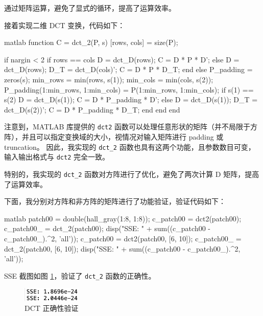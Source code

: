 \documentclass[a4paper]{article}  %
\begin{document}
通过矩阵运算，避免了显式的循环，提高了运算效率。

接着实现二维 DCT 变换，代码如下：

\begin{codeblock}{matlab}
function C = dct_2(P, s)
    [rows, cols] = size(P);
    
    if nargin < 2
        if rows == cols
            D = dct_D(rows);
            C = D * P * D';
        else
            D = dct_D(rows);
            D_T = dct_D(cols)';
            C = D * P * D_T;
        end
    else
        P_padding = zeros(s);
        min_rows = min(rows, s(1));
        min_cols = min(cols, s(2));
        P_padding(1:min_rows, 1:min_cols) = P(1:min_rows, 1:min_cols);
        if s(1) == s(2)
            D = dct_D(s(1));
            C = D * P_padding * D';
        else
            D = dct_D(s(1));
            D_T = dct_D(s(2))';
            C = D * P_padding * D_T;
        end
    end
end
\end{codeblock}

注意到，MATLAB 库提供的 \texttt{dct2} 函数可以处理任意形状的矩阵（并不局限于方阵），并且可以指定变换域的大小，视情况对输入矩阵进行 padding 或 truncation。
因此，我实现的 \texttt{dct\_2} 函数也具有这两个功能，且参数数目可变，输入输出格式与 \texttt{dct2} 完全一致。

特别的，我实现的 \texttt{dct\_2} 函数对方阵进行了优化，避免了两次计算 D 矩阵，提高了运算效率。

下面，我分别对方阵和非方阵的矩阵进行了功能验证，验证代码如下：

\begin{codeblock}{matlab}
patch00 = double(hall_gray(1:8, 1:8));
c_patch00 = dct2(patch00);
c_patch00_ = dct_2(patch00);
disp("SSE: " + sum((c_patch00 - c_patch00_).^2, 'all'));
c_patch00 = dct2(patch00, [6, 10]);
c_patch00_ = dct_2(patch00, [6, 10]);
disp("SSE: " + sum((c_patch00 - c_patch00_).^2, 'all'));
\end{codeblock}

SSE 截图如图 \ref{fig:2_2_sse}，验证了 \texttt{dct\_2} 函数的正确性。

\begin{figure}[ht]
    \centering
    \includegraphics[width=0.25\textwidth]{asserts/2_2_sse.png}
    \caption{
        DCT 正确性验证
    }\label{fig:2_2_sse}
\end{figure}
\end{document}
